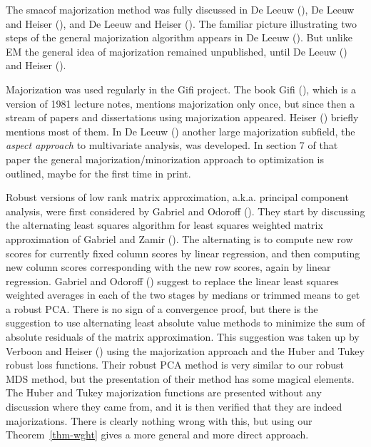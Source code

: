 \documentclass[
  12pt,
  letterpaper,
  DIV=11,
  numbers=noendperiod]{scrartcl}
\theoremstyle{definition}
\theoremstyle{plain}
\theoremstyle{plain}
\theoremstyle{remark}
\begin{document}
The smacof majorization method was fully discussed in De Leeuw
(), De Leeuw and Heiser
(), and De Leeuw and Heiser
(). The familiar picture
illustrating two steps of the general majorization algorithm appears in
De Leeuw (). But unlike EM the
general idea of majorization remained unpublished, until De Leeuw
() and Heiser
().

Majorization was used regularly in the Gifi project. The book Gifi
(), which is a version of 1981 lecture
notes, mentions majorization only once, but since then a stream of
papers and dissertations using majorization appeared. Heiser
() briefly mentions most of them. In De
Leeuw () another large majorization
subfield, the \emph{aspect approach} to multivariate analysis, was
developed. In section 7 of that paper the general
majorization/minorization approach to optimization is outlined, maybe
for the first time in print.

Robust versions of low rank matrix approximation, a.k.a. principal
component analysis, were first considered by Gabriel and Odoroff
(). They start by discussing the
alternating least squares algorithm for least squares weighted matrix
approximation of Gabriel and Zamir
(). The alternating is to compute
new row scores for currently fixed column scores by linear regression,
and then computing new column scores corresponding with the new row
scores, again by linear regression. Gabriel and Odoroff
() suggest to replace the linear
least squares weighted averages in each of the two stages by medians or
trimmed means to get a robust PCA. There is no sign of a convergence
proof, but there is the suggestion to use alternating least absolute
value methods to minimize the sum of absolute residuals of the matrix
approximation. This suggestion was taken up by Verboon and Heiser
() using the majorization approach
and the Huber and Tukey robust loss functions. Their robust PCA method
is very similar to our robust MDS method, but the presentation of their
method has some magical elements. The Huber and Tukey majorization
functions are presented without any discussion where they came from, and
it is then verified that they are indeed majorizations. There is clearly
nothing wrong with this, but using our Theorem~\ref{thm-wght} gives a
more general and more direct approach.
\end{document}

